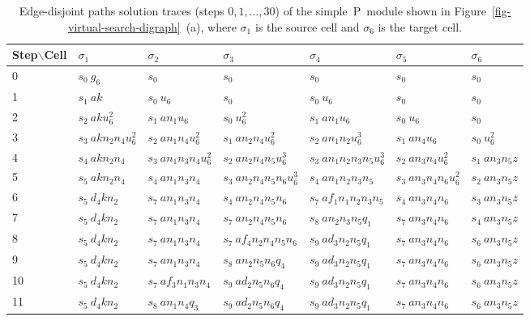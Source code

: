 \documentclass[preliminary,copyright,creativecommons]{eptcs}
\newcommand{\myway}[1]{\raisebox{-4pt}{\rule{0pt}{16pt}}\colorbox[rgb]{.7,.7,.7}{#1}}
\theoremstyle{remark}
\begin{document}
\begin{table}[h]
\caption{Edge-disjoint paths solution traces (steps $0, 1, \ldots, 30$) of the 
simple~P~module shown in Figure~\ref{fig-virtual-search-digraph}~(a),
where $\sigma_1$ is the source cell and $\sigma_6$ is the target cell.}
\label{tab-trace}
\begin{center}
\renewcommand{\tabcolsep}{3.0pt}
\renewcommand{\arraystretch}{1.3}
\footnotesize
\noindent
\begin{tabular}{ | l | l | l | l | l | l | l | }
\hline
Step$\backslash$Cell
 & $\sigma_1$ & $\sigma_2$ & $\sigma_3$ & $\sigma_4$ & $\sigma_5$ & $\sigma_6$ \\ \hline
0 & $s_0~ g_6$ & $s_0~ $ & $s_0~ $ & $s_0~ $ & $s_0~ $ & $s_0~ $ \\ \hline
1 & $s_1~ ak$ & $s_0~ u_6$ & $s_0~ $ & $s_0~ u_6$ & $s_0~ $ & $s_0~ $ \\ \hline
2 & $s_2~ aku_6^{2}$ & $s_1~ an_1u_6$ & $s_0~ u_6^{2}$ & $s_1~ an_1u_6$ & $s_0~ u_6$ & $s_0~ $ \\ \hline
3 & $s_3~ akn_2n_4u_6^{2}$ & $s_2~ an_1n_4u_6^{2}$ & $s_1~ an_2n_4u_6^{2}$ & $s_2~ an_1n_2u_6^{3}$ & $s_1~ an_4u_6$ & $s_0~ u_6^{2}$ \\ \hline
4 & \myway{$s_4~ akn_2n_4$} & $s_3~ an_1n_3n_4u_6^{2}$ & $s_2~ an_2n_4n_5u_6^{3}$ & $s_3~ an_1n_2n_3n_5u_6^{3}$ & $s_2~ an_3n_4u_6^{2}$ & $s_1~ an_3n_5z$ \\ \hline
5 & $s_5~ akn_2n_4$ & \myway{$s_4~ an_1n_3n_4$} & $s_3~ an_2n_4n_5n_6u_6^{3}$ & \myway{$s_4~ an_1n_2n_3n_5$} & $s_3~ an_3n_4n_6u_6^{2}$ & $s_2~ an_3n_5z$ \\ \hline
6 & $s_5~ d_4kn_2$ & $s_7~ an_1n_3n_4$ & \myway{$s_4~ an_2n_4n_5n_6$} & $s_7~ af_1n_1n_2n_3n_5$ & \myway{$s_4~ an_3n_4n_6$} & $s_3~ an_3n_5z$ \\ \hline
7 & $s_5~ d_4kn_2$ & $s_7~ an_1n_3n_4$ & $s_7~ an_2n_4n_5n_6$ & $s_8~ an_2n_3n_5q_1$ & $s_7~ an_3n_4n_6$ & \myway{$s_4~ an_3n_5z$} \\ \hline
8 & $s_5~ d_4kn_2$ & $s_7~ an_1n_3n_4$ & $s_7~ af_4n_2n_4n_5n_6$ & $s_9~ ad_3n_2n_5q_1$ & $s_7~ an_3n_4n_6$ & $s_6~ an_3n_5z$ \\ \hline
9 & $s_5~ d_4kn_2$ & $s_7~ an_1n_3n_4$ & $s_8~ an_2n_5n_6q_4$ & $s_9~ ad_3n_2n_5q_1$ & $s_7~ an_3n_4n_6$ & $s_6~ an_3n_5z$ \\ \hline
10 & $s_5~ d_4kn_2$ & $s_7~ af_3n_1n_3n_4$ & $s_9~ ad_2n_5n_6q_4$ & $s_9~ ad_3n_2n_5q_1$ & $s_7~ an_3n_4n_6$ & $s_6~ an_3n_5z$ \\ \hline
11 & $s_5~ d_4kn_2$ & $s_8~ an_1n_4q_3$ & $s_9~ ad_2n_5n_6q_4$ & $s_9~ ad_3n_2n_5q_1$ & $s_7~ an_3n_4n_6$ & $s_6~ an_3n_5z$ \\ \hline

\end{tabular}
\end{center}
\end{table}
\end{document}
